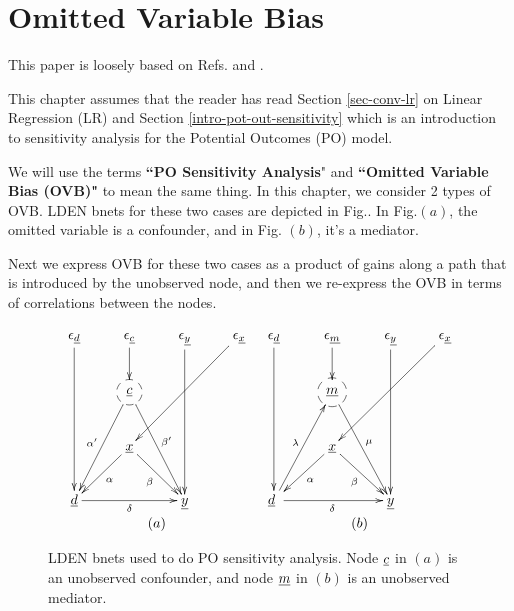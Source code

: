 \chapter{Omitted Variable Bias}
\label{ch-omitted-var-bias}

This paper is
loosely based on Refs.\cite{cinelli-haz}
and \cite{cherno-cinelli}.

This chapter assumes that the
reader has read Section 
\ref{sec-conv-lr}
on Linear Regression (LR)
and Section \ref{intro-pot-out-sensitivity}
which is an introduction
to sensitivity analysis
for the Potential Outcomes (PO)
model.

We will
 use the terms {\bf ``PO Sensitivity Analysis}"
and {\bf ``Omitted Variable Bias (OVB)"}
to mean the same thing.
In this chapter,
we consider 2 types 
of OVB. LDEN bnets for
these two cases are depicted in Fig.\label{eq-ovb-sen-ana}.
In Fig.\label{eq-ovb-sen-ana}$(a)$, the omitted variable
is a confounder,
and in Fig.\label{eq-ovb-sen-ana} $(b)$,
it's a mediator.

Next we express OVB for these two cases as
a product of gains along a path
that is introduced by the unobserved node, and then we re-express the OVB 
in terms of correlations between the nodes.
 


\begin{figure}[h!]
$$
\begin{array}{cc}
\xymatrix{
\eps_\rvd\ar[ddd]
&\eps_\rvc\ar[d]
&\eps_\rvy\ar[ddd]
&\eps_\rvx\ar[ddll]
\\
&*++[F-o]{\rvc}\ar[ldd]_{\alp'}
\ar[rdd]^{\beta'}
\\
&\rvx
\ar[ld]^\alp
\ar[rd]_\beta
\\
\rvd\ar[rr]_\delta
&&\rvy
}
&
\xymatrix{
\eps_\rvd\ar[ddd]
&\eps_\rvm\ar[d]
&\eps_\rvy\ar[ddd]
&\eps_\rvx\ar[ddll]
\\
&*++[F-o]{\rvm}
\ar[rdd]^{\mu}
\\
&\rvx
\ar[ld]^\alp
\ar[rd]_\beta
\\
\rvd\ar[rr]_\delta
\
\ar[ruu]^\lam
&&\rvy
}
\\
(a)&(b)
\end{array}
$$
\caption{LDEN bnets used to do PO
sensitivity analysis.
Node ${\underline{c}}$ in $(a)$
is an unobserved confounder,
and node ${\underline{m}}$ in $(b)$
is an unobserved mediator.}
\label{eq-ovb-sen-ana}
\end{figure}







